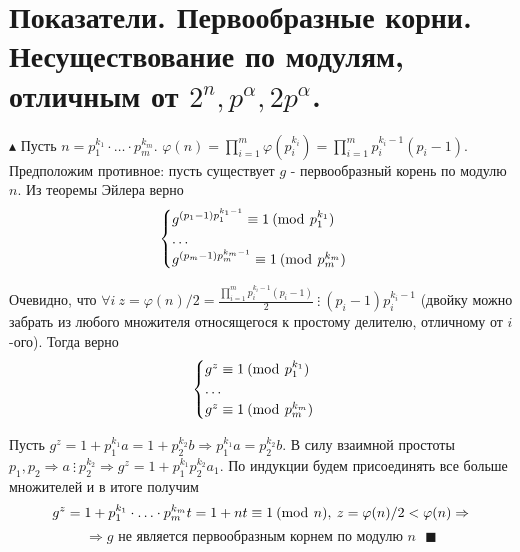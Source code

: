 \section{Показатели. Первообразные корни. Несуществование по модулям, отличным от $2^n, p^\alpha, 2p^\alpha$.}
\par $\blacktriangle$ Пусть $n=p_1^{k_1} \cdot \ldots \cdot p_m^{k_m}$. $\varphi(n)=\prod_{i=1}^m \varphi(p_i^{k_i})=\prod_{i=1}^m p_i^{k_i-1}(p_i-1)$. Предположим противное: пусть существует $g$ - первообразный корень по модулю $n$. Из теоремы Эйлера верно
$$\begin{cases}
   g^{(p_1-1)p_1^{k_1-1}} \equiv 1 \: (\operatorname{mod} \: p_1^{k_1})\\
   \ldots\\
   g^{(p_m-1)p_m^{k_m-1}} \equiv 1 \: (\operatorname{mod} \: p_m^{k_m})
 \end{cases}$$
 \par Очевидно, что $\forall i \: z=\varphi(n)/2=\frac{\prod_{i=1}^m p_i^{k_i-1}(p_i-1)}{2} \: \vdots \: (p_i-1)p_i^{k_i-1}$ (двойку можно забрать из любого множителя относящегося к простому делителю, отличному от $i$-ого). Тогда верно
 $$\begin{cases}
   g^{z} \equiv 1 \: (\operatorname{mod} \: p_1^{k_1})\\
   \ldots\\
   g^{z} \equiv 1 \: (\operatorname{mod} \: p_m^{k_m})
 \end{cases}$$
 \par Пусть $g^z=1+p_1^{k_1}a=1+p_2^{k_2}b \Rightarrow p_1^{k_1}a=p_2^{k_2}b$. В силу взаимной простоты $p_1, p_2 \Rightarrow a \: \vdots \: p_2^{k_2} \Rightarrow g^z=1+p_1^{k_1}p_2^{k_2}a_1$. По индукции будем присоединять все больше множителей и в итоге получим
 $$g^z=1+p_1^{k_1}\cdot\ldots\cdot p_m^{k_m}t=1+nt \equiv 1 \: (\operatorname{mod} \: n), \: z=\varphi(n)/2 < \varphi(n) \Rightarrow$$ $$\Rightarrow g \text{ не является первообразным корнем по модулю $n$ } \blacksquare$$